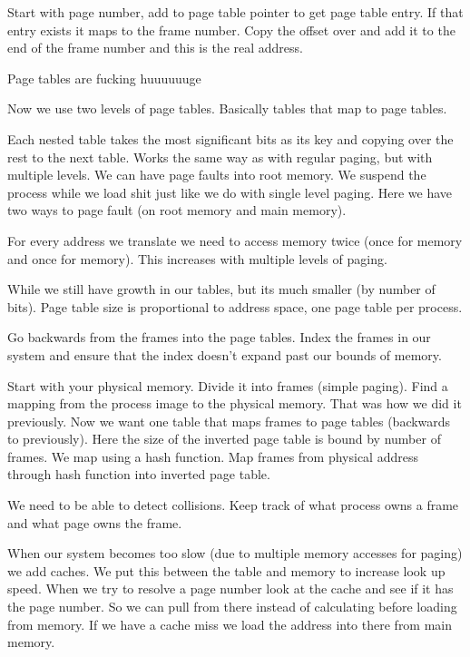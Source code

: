 \documentclass{article}
\begin{document}

Start with page number, add to page table pointer to get page table entry. If that entry exists it maps to the frame number. Copy the offset over and add it to the end of the frame number and this is the real address.

Page tables are fucking huuuuuuge


Now we use two levels of page tables. Basically tables that map to page tables.

Each nested table takes the most significant bits as its key and copying over the rest to the next table. Works the same way as with regular paging, but with multiple levels. We can have page faults into root memory. We suspend the process while we load shit just like we do with single level paging. Here we have two ways to page fault (on root memory and main memory).

For every address we translate we need to access memory twice (once for memory and once for memory). This increases with multiple levels of paging.

While we still have growth in our tables, but its much smaller (by number of bits). Page table size is proportional to address space, one page table per process.

Go backwards from the frames into the page tables. Index the frames in our system and ensure that the index doesn't expand past our bounds of memory.

Start with your physical memory. Divide it into frames (simple paging). Find a mapping from the process image to the physical memory. That was how we did it previously. Now we want one table that maps frames to page tables (backwards to previously). Here the size of the inverted page table is bound by number of frames. We map using a hash function. Map frames from physical address through hash function into inverted page table.

We need to be able to detect collisions. Keep track of what process owns a frame and what page owns the frame.

When our system becomes too slow (due to multiple memory accesses for paging) we add caches. We put this between the table and memory to increase look up speed. When we try to resolve a page number look at the cache and see if it has the page number. So we can pull from there instead of calculating before loading from memory. If we have a cache miss we load the address into there from main memory.
\end{document}
